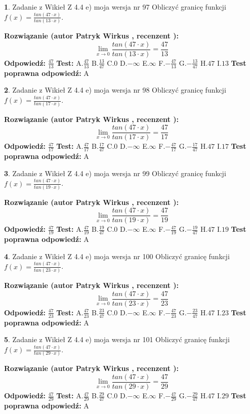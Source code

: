 \documentclass[12pt, a4paper]{article}
\theoremstyle{definition} %
\newtheorem{zad}{}
\newcommand{\zadStart}[1]{\begin{zad}#1\newline}
\newcommand{\zadStop}{\end{zad}}
\newcommand{\rozwStart}[2]{\noindent \textbf{Rozwiązanie (autor #1 , recenzent #2): }\newline}
\newcommand{\rozwStop}{\newline}
\newcommand{\odpStart}{\noindent \textbf{Odpowiedź:}\newline}
\newcommand{\odpStop}{\newline}
\newcommand{\testStart}{\noindent \textbf{Test:}\newline}
\newcommand{\testStop}{\newline}
\newcommand{\kluczStart}{\noindent \textbf{Test poprawna odpowiedź:}\newline}
\newcommand{\kluczStop}{\newline}
\begin{document}
\zadStart{Zadanie z Wikieł Z 4.4 e) moja wersja nr 97}
Obliczyć granicę funkcji $f(x)=\frac{tan(47\cdot x)}{tan(13\cdot x)}$.
\zadStop
\rozwStart{Patryk Wirkus}{}
$$\lim\limits_{x\to 0}\frac{tan(47\cdot x)}{tan(13\cdot x)}=
\frac{47}{13}$$
\rozwStop
\odpStart
$\frac{47}{13}$
\odpStop
\testStart
A.$\frac{47}{13}$
B.$\frac{13}{47}$
C.$0$
D.$-\infty$
E.$\infty$
F.$-\frac{47}{13}$
G.$-\frac{13}{47}$
H.$47$
I.$13$
\testStop
\kluczStart
A
\kluczStop



\zadStart{Zadanie z Wikieł Z 4.4 e) moja wersja nr 98}
Obliczyć granicę funkcji $f(x)=\frac{tan(47\cdot x)}{tan(17\cdot x)}$.
\zadStop
\rozwStart{Patryk Wirkus}{}
$$\lim\limits_{x\to 0}\frac{tan(47\cdot x)}{tan(17\cdot x)}=
\frac{47}{17}$$
\rozwStop
\odpStart
$\frac{47}{17}$
\odpStop
\testStart
A.$\frac{47}{17}$
B.$\frac{17}{47}$
C.$0$
D.$-\infty$
E.$\infty$
F.$-\frac{47}{17}$
G.$-\frac{17}{47}$
H.$47$
I.$17$
\testStop
\kluczStart
A
\kluczStop



\zadStart{Zadanie z Wikieł Z 4.4 e) moja wersja nr 99}
Obliczyć granicę funkcji $f(x)=\frac{tan(47\cdot x)}{tan(19\cdot x)}$.
\zadStop
\rozwStart{Patryk Wirkus}{}
$$\lim\limits_{x\to 0}\frac{tan(47\cdot x)}{tan(19\cdot x)}=
\frac{47}{19}$$
\rozwStop
\odpStart
$\frac{47}{19}$
\odpStop
\testStart
A.$\frac{47}{19}$
B.$\frac{19}{47}$
C.$0$
D.$-\infty$
E.$\infty$
F.$-\frac{47}{19}$
G.$-\frac{19}{47}$
H.$47$
I.$19$
\testStop
\kluczStart
A
\kluczStop



\zadStart{Zadanie z Wikieł Z 4.4 e) moja wersja nr 100}
Obliczyć granicę funkcji $f(x)=\frac{tan(47\cdot x)}{tan(23\cdot x)}$.
\zadStop
\rozwStart{Patryk Wirkus}{}
$$\lim\limits_{x\to 0}\frac{tan(47\cdot x)}{tan(23\cdot x)}=
\frac{47}{23}$$
\rozwStop
\odpStart
$\frac{47}{23}$
\odpStop
\testStart
A.$\frac{47}{23}$
B.$\frac{23}{47}$
C.$0$
D.$-\infty$
E.$\infty$
F.$-\frac{47}{23}$
G.$-\frac{23}{47}$
H.$47$
I.$23$
\testStop
\kluczStart
A
\kluczStop



\zadStart{Zadanie z Wikieł Z 4.4 e) moja wersja nr 101}
Obliczyć granicę funkcji $f(x)=\frac{tan(47\cdot x)}{tan(29\cdot x)}$.
\zadStop
\rozwStart{Patryk Wirkus}{}
$$\lim\limits_{x\to 0}\frac{tan(47\cdot x)}{tan(29\cdot x)}=
\frac{47}{29}$$
\rozwStop
\odpStart
$\frac{47}{29}$
\odpStop
\testStart
A.$\frac{47}{29}$
B.$\frac{29}{47}$
C.$0$
D.$-\infty$
E.$\infty$
F.$-\frac{47}{29}$
G.$-\frac{29}{47}$
H.$47$
I.$29$
\testStop
\kluczStart
A
\kluczStop
\end{document}
